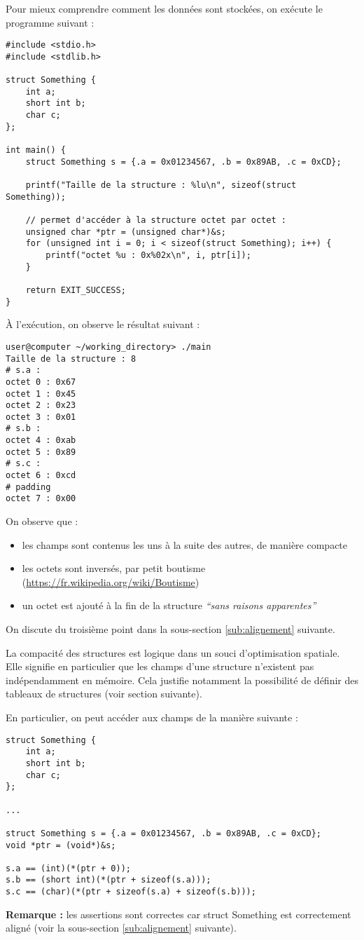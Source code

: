 \documentclass[../../../main.tex]{subfiles}
\begin{document}
Pour mieux comprendre comment les données sont stockées, on exécute le programme suivant :
\begin{verbatim}
#include <stdio.h>
#include <stdlib.h>

struct Something {
	int a;
	short int b;
	char c;
};

int main() {
	struct Something s = {.a = 0x01234567, .b = 0x89AB, .c = 0xCD};

	printf("Taille de la structure : %lu\n", sizeof(struct Something));

	// permet d'accéder à la structure octet par octet :
	unsigned char *ptr = (unsigned char*)&s; 
	for (unsigned int i = 0; i < sizeof(struct Something); i++) {
		printf("octet %u : 0x%02x\n", i, ptr[i]);
	}

	return EXIT_SUCCESS;
}
\end{verbatim}
À l'exécution, on observe le résultat suivant :
\begin{verbatim}
user@computer ~/working_directory> ./main
Taille de la structure : 8
# s.a :
octet 0 : 0x67
octet 1 : 0x45
octet 2 : 0x23
octet 3 : 0x01
# s.b :
octet 4 : 0xab
octet 5 : 0x89
# s.c :
octet 6 : 0xcd
# padding
octet 7 : 0x00
\end{verbatim}
On observe que :
\begin{itemize}
	\item les champs sont contenus les uns à la suite des autres, de manière compacte
	\item les octets sont inversés, par petit boutisme (\url{https://fr.wikipedia.org/wiki/Boutisme})
	\item un octet est ajouté à la fin de la structure \textit{``sans raisons apparentes''}
\end{itemize}
On discute du troisième point dans la sous-section \ref{sub:alignement} suivante.

La compacité des structures est logique dans un souci d'optimisation spatiale. Elle signifie en particulier que les champs d'une structure n'existent pas indépendamment en mémoire. Cela justifie notamment la possibilité de définir des tableaux de structures (voir section suivante).

En particulier, on peut accéder aux champs de la manière suivante :
\begin{verbatim}
struct Something {
	int a;
	short int b;
	char c;
};

...

struct Something s = {.a = 0x01234567, .b = 0x89AB, .c = 0xCD};
void *ptr = (void*)&s;

s.a == (int)(*(ptr + 0));
s.b == (short int)(*(ptr + sizeof(s.a)));
s.c == (char)(*(ptr + sizeof(s.a) + sizeof(s.b)));
\end{verbatim}
\textbf{Remarque :} les assertions sont correctes car \textsf{struct Something} est correctement aligné (voir la sous-section \ref{sub:alignement} suivante).
\end{document}
